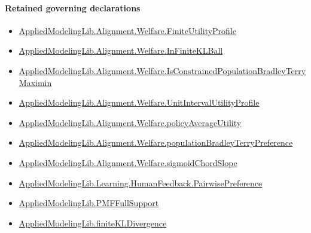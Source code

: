 \documentclass[10pt]{article}
\begin{document}
\paragraph{Retained governing declarations}
\begin{itemize}\raggedright
\item \hyperlink{library-prerequisite-56c0734f8877ddbe}{Applied\allowbreak{}Modeling\allowbreak{}Lib.\allowbreak{}Alignment.\allowbreak{}Welfare.\allowbreak{}Finite\allowbreak{}Utility\allowbreak{}Profile}
\item \hyperlink{library-prerequisite-1d625de57bf58a6a}{Applied\allowbreak{}Modeling\allowbreak{}Lib.\allowbreak{}Alignment.\allowbreak{}Welfare.\allowbreak{}In\allowbreak{}Finite\allowbreak{}KL\allowbreak{}Ball}
\item \hyperlink{governing-declaration-2b862fbe69d5aa04}{Applied\allowbreak{}Modeling\allowbreak{}Lib.\allowbreak{}Alignment.\allowbreak{}Welfare.\allowbreak{}Is\allowbreak{}Constrained\allowbreak{}Population\allowbreak{}Bradley\allowbreak{}Terry\allowbreak{}Maximin}
\item \hyperlink{library-prerequisite-cbe8afa0d6d1ba78}{Applied\allowbreak{}Modeling\allowbreak{}Lib.\allowbreak{}Alignment.\allowbreak{}Welfare.\allowbreak{}Unit\allowbreak{}Interval\allowbreak{}Utility\allowbreak{}Profile}
\item \hyperlink{library-prerequisite-184c74a4db4311c2}{Applied\allowbreak{}Modeling\allowbreak{}Lib.\allowbreak{}Alignment.\allowbreak{}Welfare.\allowbreak{}policy\allowbreak{}Average\allowbreak{}Utility}
\item \hyperlink{library-prerequisite-cf06d15d7f8b7c31}{Applied\allowbreak{}Modeling\allowbreak{}Lib.\allowbreak{}Alignment.\allowbreak{}Welfare.\allowbreak{}population\allowbreak{}Bradley\allowbreak{}Terry\allowbreak{}Preference}
\item \hyperlink{governing-declaration-a4d623b8c608b566}{Applied\allowbreak{}Modeling\allowbreak{}Lib.\allowbreak{}Alignment.\allowbreak{}Welfare.\allowbreak{}sigmoid\allowbreak{}Chord\allowbreak{}Slope}
\item \hyperlink{library-prerequisite-7e2db20cf087d9ba}{Applied\allowbreak{}Modeling\allowbreak{}Lib.\allowbreak{}Learning.\allowbreak{}Human\allowbreak{}Feedback.\allowbreak{}Pairwise\allowbreak{}Preference}
\item \hyperlink{library-prerequisite-268c959ee7d2d148}{Applied\allowbreak{}Modeling\allowbreak{}Lib.\allowbreak{}PMF\allowbreak{}Full\allowbreak{}Support}
\item \hyperlink{library-prerequisite-d3573881ae45d4c6}{Applied\allowbreak{}Modeling\allowbreak{}Lib.\allowbreak{}finite\allowbreak{}KL\allowbreak{}Divergence}

\end{itemize}
\end{document}
